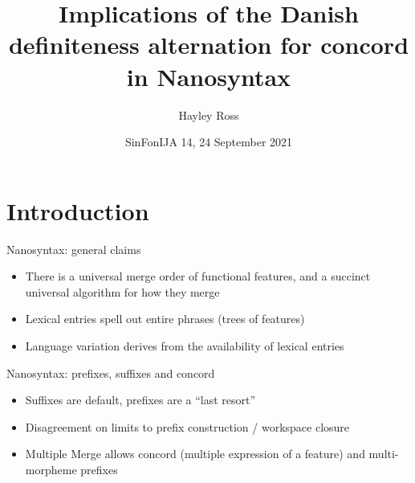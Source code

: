 \documentclass[aspectratio=149]{beamer}
\title{Implications of the Danish definiteness alternation for concord in Nanosyntax}
\date{SinFonIJA 14, 24 September 2021}
\author{Hayley Ross}
\institute{Harvard University}
\begin{document}
\maketitle

\section{Introduction}
\begin{frame}{Nanosyntax: general claims   {\hfill\footnotesize\citep{baunaz2018nanosyntax}}}
\begin{itemize}
\item There is a universal merge order of functional features, and a succinct universal algorithm for how they merge
\item Lexical entries spell out entire phrases (trees of features)
\item Language variation derives from the availability of lexical entries
\end{itemize}
\end{frame}

\begin{frame}{Nanosyntax: prefixes, suffixes and concord}
\begin{itemize}
\item Suffixes are default, prefixes are a ``last resort'' \citep{starke2018complex}
\item Disagreement
on limits to prefix construction / workspace closure \\
\citep{caha2019case, starke2018complex, caha2019fine}
\item Multiple Merge \citep{caha2019case} allows concord (multiple expression of a feature) and multi-morpheme prefixes
\end{itemize}
\end{frame}
\end{document}
